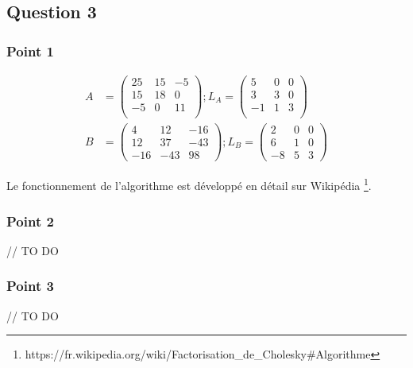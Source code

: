 \subsection{Question 3}

\subsubsection{Point 1}

\begin{equation}
	\begin{aligned}
		A &= 
		\begin{pmatrix}
			25 & 15 & -5\\
			15 & 18 & 0\\
			-5 & 0 & 11\\
		\end{pmatrix};
		L_A = 
		\begin{pmatrix}
			5 & 0 & 0\\
			3 & 3 & 0\\
			-1 & 1 & 3\\
		\end{pmatrix}\\
		B &= 
		\begin{pmatrix}
			4 & 12 & -16\\
			12 & 37 & -43\\
			-16 & -43 & 98
		\end{pmatrix};
		L_B =
		\begin{pmatrix}
			2 & 0 & 0\\
			6 & 1 & 0\\
			-8 & 5 & 3
		\end{pmatrix}
	\end{aligned}
\end{equation}

Le fonctionnement de l'algorithme est développé en détail sur Wikipédia \footnote{https://fr.wikipedia.org/wiki/Factorisation\_de\_Cholesky\#Algorithme}.


\subsubsection{Point 2}

// TO DO

\subsubsection{Point 3}

// TO DO